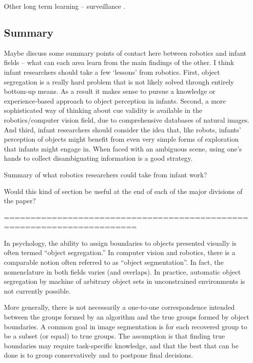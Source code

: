 Other long term learning -- surveillance \cite{stauffer00learning}.

\subsection{Summary}

Maybe discuss some summary points of contact here between robotics and
infant fields -- what can each area learn from the main findings
of the other.  I think infant researchers should take a few
`lessons' from robotics.  First, object segregation is
a really hard problem that is not likely solved through entirely
bottom-up means.  As a result it makes sense to pursue a knowledge or
experience-based approach to object perception in infants.  Second, a
more sophisticated way of thinking about cue validity is available in
the robotics/computer vision field, due to comprehensive databases of
natural images.  And third, infant researchers should consider the
idea that, like robots, infants' perception of objects might
benefit from even very simple forms of exploration that infants might
engage in.  When faced with an ambiguous scene, using one's
hands to collect disambiguating information is a good strategy.

Summary of what robotics researchers could take from infant work?

Would this kind of section be useful at the end of each of the major
divisions of the paper?


\fi





=======================================================================



\ifverbose
In psychology, the ability to assign boundaries to objects 
presented visually is 
often termed ``object segregation.''  In computer vision and robotics, there
is a comparable notion often referred to as ``object segmentation''.
In fact, the nomenclature in both fields varies (and overlaps).
%
In practice, automatic object segregation by machine
of arbitrary object sets in unconstrained environments is not 
currently possible.
\fi

%
%
\ifverbose
More generally, there is not necessarily a one-to-one
correspondence intended
 between the groups
formed by an algorithm and the true groups formed by object boundaries.
A common
goal in image segmentation is for each recovered group to be a subset (or equal) to
true groups.  The assumption is that finding true boundaries may
require task-specific knowledge, and that the best that can be done is
to group conservatively and to postpone final decisions.  
\fi
%

